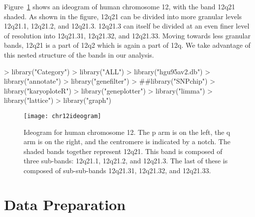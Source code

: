 \documentclass[11pt]{article}
\begin{document}
Figure~\ref{fig:chr12ideogram} shows an ideogram of human chromosome
12, with the band 12q21 shaded.  As shown in the figure, 12q21 can be
divided into more granular levels 12q21.1, 12q21.2, and 12q21.3.
12q21.3 can itself be divided at an even finer level of resolution
into 12q21.31, 12q21.32, and 12q21.33.  Moving towards less granular
bands, 12q21 is a part of 12q2 which is again a part of 12q.  We take
advantage of this nested structure of the bands in our analysis.
\begin{Schunk}
\begin{Sinput}
> library("Category")
> library("ALL")
> library("hgu95av2.db")
> library("annotate")
> library("genefilter")
> ##library("SNPchip")
> library("karyoploteR")
> library("geneplotter")
> library("limma")
> library("lattice")
> library("graph")
\end{Sinput}
\end{Schunk}




%
\begin{figure}[tb]
\begin{center}
%
\end{center}
\texttt{[image: chr12ideogram]}
\caption{Ideogram for human chromosome 12.  The p arm is on the left,
  the q arm is on the right, and the centromere is indicated by a
  notch.  The shaded bands together represent 12q21.  This band is
  composed of three sub-bands: 12q21.1, 12q21.2, and 12q21.3.  The
  last of these is composed of sub-sub-bands 12q21.31, 12q21.32, and
  12q21.33. }
\label{fig:chr12ideogram}
\end{figure}
%


\section{Data Preparation}
\end{document}
